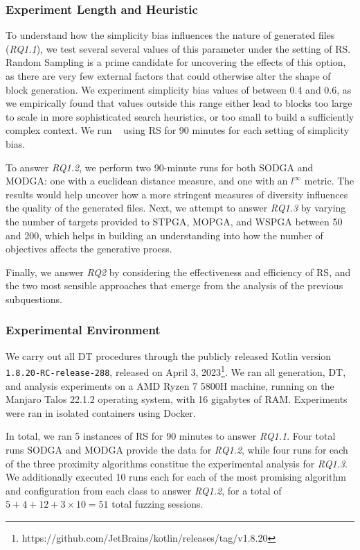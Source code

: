 \subsubsection{Experiment Length and Heuristic}

To understand how the simplicity bias influences the nature
of generated files (\textit{RQ1.1}), we test several several values of this parameter under
the setting of \gls{RS}.
Random Sampling is a prime candidate for uncovering the effects of this
option, as there are very few external factors that could otherwise alter
the shape of block generation.
We experiment simplicity bias values of between 0.4 and 0.6, as we empirically found
that values outside this range either lead to blocks too large to scale in
more sophisticated search heuristics, or too small to build a sufficiently
complex context.
We run \kf~ using \gls{RS} for 90 minutes for each setting of simplicity bias.

To answer \textit{RQ1.2}, we perform two 90-minute runs for both \gls{SODGA} and \gls{MODGA}:
one with a euclidean distance measure, and one with an $l^\infty$ metric.
The results would help uncover how a more stringent measures of diversity
influences the quality of the generated files.
Next, we attempt to answer \textit{RQ1.3} by varying the number of targets provided
to \gls{STPGA}, \gls{MOPGA}, and \gls{WSPGA} between 50 and 200, which
helps in building an understanding into how the number of objectives affects
the generative proess.

Finally, we answer \textit{RQ2} by considering the effectiveness and efficiency
of \gls{RS}, and the two most sensible approaches that emerge from the analysis of the
previous subquestions.

\subsubsection{Experimental Environment}

We carry out all \gls{DT} procedures through the publicly released
Kotlin version \texttt{1.8.20-RC-release-288},
released on April 3, 2023\footnote{https://github.com/JetBrains/kotlin/releases/tag/v1.8.20}.
We ran all generation, \gls{DT}, and analysis experiments on a
AMD Ryzen 7 5800H machine, running on the Manjaro Talos 22.1.2
operating system, with 16 gigabytes of RAM.
Experiments were ran in isolated containers using Docker.

In total, we ran 5 instances of \gls{RS} for 90 minutes to answer \textit{RQ1.1}.
Four total runs \gls{SODGA} and \gls{MODGA} provide the data for \textit{RQ1.2},
while four runs for each of the three proximity algorithms constitue the experimental
analysis for \textit{RQ1.3}.
We additionally executed 10 runs each for each of the most promising algorithm
and configuration from each class to answer \textit{RQ1.2},
for a total of $5 + 4 + 12 + 3 \times 10 = 51$ total fuzzing sessions.
